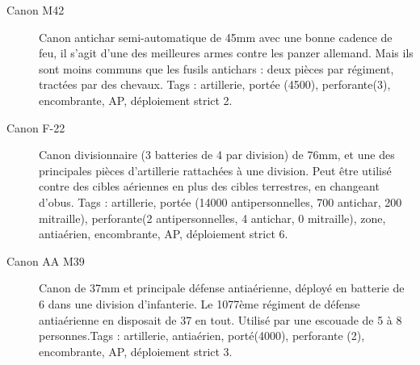 \documentclass{report}
\begin{document}
\begin{multicols}{2}
\begin{description}
\item[Canon M42] Canon antichar semi-automatique de 45mm avec une bonne cadence de feu, il s'agit d'une des meilleures armes contre les panzer allemand. Mais ils sont moins communs que les fusils antichars : deux pièces par régiment, tractées par des chevaux. Tags : artillerie, portée (4500), perforante(3), encombrante, AP, déploiement strict 2.
\item[Canon F-22] Canon divisionnaire (3 batteries de 4 par division) de 76mm, et une des principales pièces d'artillerie rattachées à une division. Peut être utilisé contre des cibles aériennes en plus des cibles terrestres, en changeant d'obus. Tags : artillerie, portée (14000 antipersonnelles, 700 antichar, 200 mitraille), perforante(2 antipersonnelles, 4 antichar, 0 mitraille), zone, antiaérien, encombrante, AP, déploiement strict 6.
\item[Canon AA M39]Canon de 37mm et principale défense antiaérienne, déployé en batterie de 6 dans une division d'infanterie. Le 1077ème régiment de défense antiaérienne en disposait de 37 en tout. Utilisé par une escouade de 5 à 8 personnes.Tags : artillerie, antiaérien, porté(4000), perforante (2), encombrante, AP, déploiement strict 3.
\end{description}


\end{multicols}
\end{document}
